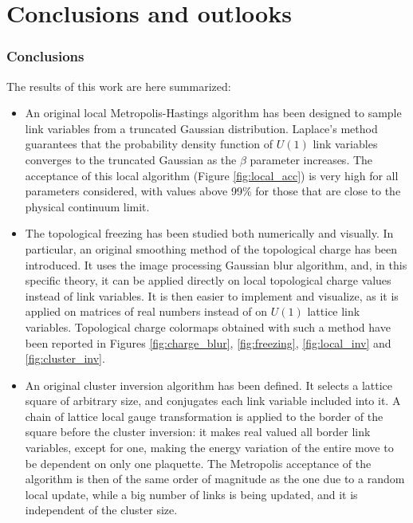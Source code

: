 \chapter{Conclusions and outlooks}\label{ch:conclusion}
\subsection*{Conclusions}
The results of this work are here summarized:
\begin{itemize}
    \item
        An original local Metropolis-Hastings algorithm has been designed to sample link variables from a truncated Gaussian distribution.
        Laplace's method guarantees that the probability density function of $U(1)$ link variables converges to the truncated Gaussian
        as the $\beta$ parameter increases.
        The acceptance of this local algorithm (Figure \ref{fig:local_acc}) is very high for all parameters considered,
        with values above 99\% for those that are close to the physical continuum limit.
    \item
        The topological freezing has been studied both numerically and visually.
        In particular, an original smoothing method of the topological charge has been introduced.
        It uses the image processing Gaussian blur algorithm, and, in this specific theory,
        it can be applied directly on local topological charge values instead of link variables.
        It is then easier to implement and visualize,
        as it is applied on matrices of real numbers instead of on $U(1)$ lattice link variables.
        Topological charge colormaps obtained with such a method have been reported in Figures
        \ref{fig:charge_blur}, \ref{fig:freezing}, \ref{fig:local_inv} and \ref{fig:cluster_inv}.
    \item
        An original cluster inversion algorithm has been defined.
        It selects a lattice square of arbitrary size, and conjugates each link variable included into it.
        A chain of lattice local gauge transformation is applied to the border of the square before the cluster inversion:
        it makes real valued all border link variables, except for one, making the energy variation of the entire move to be
        dependent on only one plaquette.
        The Metropolis acceptance of the algorithm is then of the same order of magnitude as the one due to a random local update,
        while a big number of links is being updated, and it is independent of the cluster size.

\end{itemize}
